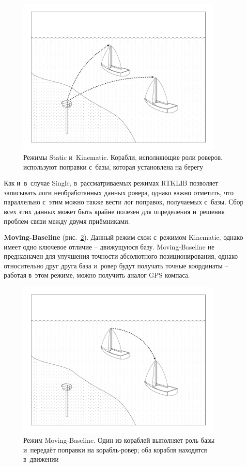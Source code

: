 \begin{dashitemize}
  \begin{figure}[h!]
    \centering
    \setlength{\fboxsep}{5pt}
    \includegraphics[height=8cm]{img/tikz/rtk-static-kinematic/pic}
    \caption{Режимы Static и~Kinematic. Корабли, исполняющие роли роверов, используют поправки с~базы, которая установлена на берегу}\label{fig:rtk-static-kinematic}
  \end{figure}
  
  Как и~в~случае Single, в~рассматриваемых режимах RTKLIB позволяет записывать логи необработанных данных ровера, однако важно отметить, что параллельно с~этим можно также вести лог поправок, получаемых с~базы. Сбор всех этих данных может быть крайне полезен для определения и~решения проблем связи между двумя приёмниками.
  
  \item \textbf{Moving-Baseline} (рис.~\ref{fig:rtk-moving-baseline}). Данный режим схож с~режимом Kinematic, однако имеет одно ключевое отличие -- движущуюся базу. Moving-Baseline не предназначен для улучшения точности абсолютного позиционирования, однако относительно друг друга база и~ровер будут получать точные координаты -- работая в~этом режиме, можно получить аналог GPS компаса.
  
  \begin{figure}[h!]
    \centering
    \setlength{\fboxsep}{5pt}
    \includegraphics[height=8cm]{img/tikz/rtk-moving-baseline/pic}
    \caption{Режим Moving-Baseline. Один из кораблей выполняет роль базы и~передаёт поправки на корабль-ровер; оба корабля находятся в~движении}\label{fig:rtk-moving-baseline}
  \end{figure}
  

\end{dashitemize}
